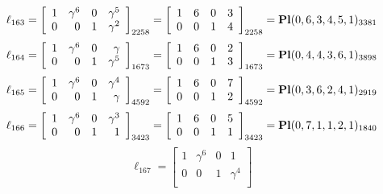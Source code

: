 \documentclass{article}
\begin{document}
{$$
\ell_{163} = 
\left[
\begin{array}{*{4}{r}}
1 & \gamma^{6} & 0 & \gamma^{5}\\
0 & 0 & 1 & \gamma^{2}\\
\end{array}
\right]
_{2258}
=
\left[
\begin{array}{*{4}c}
1  & 6  & 0  & 3\\
0  & 0  & 1  & 4\\
\end{array}
\right]_{2258}
={\rm\bf Pl}(0,6,3,4,5,1 )_{3381}$$
$$
\ell_{164} = 
\left[
\begin{array}{*{4}{r}}
1 & \gamma^{6} & 0 & \gamma \\
0 & 0 & 1 & \gamma^{5}\\
\end{array}
\right]
_{1673}
=
\left[
\begin{array}{*{4}c}
1  & 6  & 0  & 2\\
0  & 0  & 1  & 3\\
\end{array}
\right]_{1673}
={\rm\bf Pl}(0,4,4,3,6,1 )_{3898}$$
$$
\ell_{165} = 
\left[
\begin{array}{*{4}{r}}
1 & \gamma^{6} & 0 & \gamma^{4}\\
0 & 0 & 1 & \gamma \\
\end{array}
\right]
_{4592}
=
\left[
\begin{array}{*{4}c}
1  & 6  & 0  & 7\\
0  & 0  & 1  & 2\\
\end{array}
\right]_{4592}
={\rm\bf Pl}(0,3,6,2,4,1 )_{2919}$$
$$
\ell_{166} = 
\left[
\begin{array}{*{4}{r}}
1 & \gamma^{6} & 0 & \gamma^{3}\\
0 & 0 & 1 & 1\\
\end{array}
\right]
_{3423}
=
\left[
\begin{array}{*{4}c}
1  & 6  & 0  & 5\\
0  & 0  & 1  & 1\\
\end{array}
\right]_{3423}
={\rm\bf Pl}(0,7,1,1,2,1 )_{1840}$$
$$
\ell_{167} = 
\left[
\begin{array}{*{4}{r}}
1 & \gamma^{6} & 0 & 1\\
0 & 0 & 1 & \gamma^{4}\\
\end{array}
\right]
$$}
\end{document}
